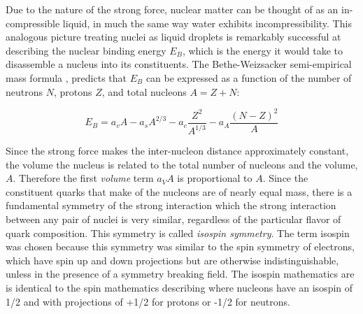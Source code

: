 Due to the nature of the strong force, nuclear matter can be thought of as an in-compressible liquid, in much the same way water exhibits incompressibility. This analogous picture treating nuclei as liquid droplets is remarkably successful at describing the nuclear binding energy $E_{B}$, which is the energy it would take to disassemble a nucleus into its constituents. The Bethe-Weizsacker semi-empirical mass formula \cite{awayforward}, predicts that $E_{B}$ can be expressed as a function of the number of neutrons $N$, protons $Z$, and total nucleons $A = Z + N$:
 
\begin{equation}
E_{B} = a_vA - a_s A^{2/3} - a_c \frac{Z^2}{A^{1/3}} - a_A \frac{(N - Z)^2}{A}
\label{eq:semiEmp}
\end{equation}

Since the strong force makes the inter-nucleon distance approximately constant, the volume the nucleus is related to the total number of nucleons and the volume, $A$. Therefore the first \emph{volume} term $a_VA$ is proportional to $A$. Since the  constituent quarks that make of the nucleons are of nearly equal mass, there is a fundamental symmetry of the strong interaction which the strong interaction between any pair of nuclei is very similar, regardless of the particular flavor of quark composition. This symmetry is called \emph{isospin symmetry}. The term isospin was chosen because this symmetry was similar to the spin symmetry of electrons, which have spin up and down projections but are otherwise indistinguishable, unless in the presence of a symmetry breaking field.  The isospin mathematics are is identical to the spin mathematics describing where nucleons have an isospin of 1/2 and with projections of  +1/2 for protons or -1/2 for neutrons. 

